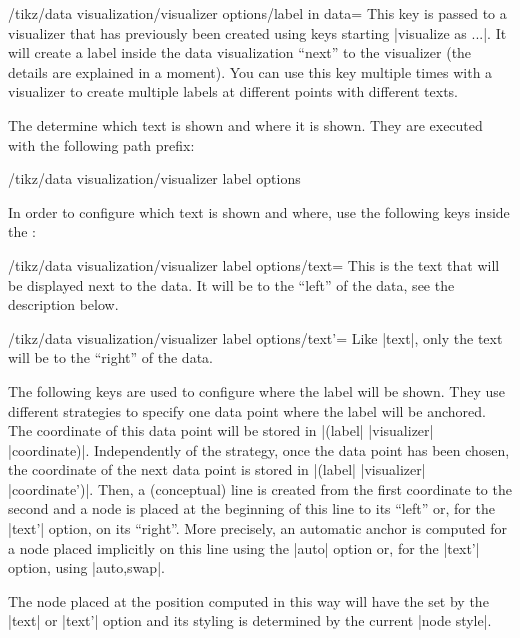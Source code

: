 \begin{key}{/tikz/data visualization/visualizer options/label in data=}
    This key is passed to a visualizer that has previously been created using
    keys starting |visualize as ...|. It will create a label inside the data
    visualization ``next'' to the visualizer (the details are explained in a
    moment). You can use this key multiple times with a visualizer to create
    multiple labels at different points with different texts.

    The  determine which text is shown and where it is shown.
    They are executed with the following path prefix:
\begin{codeexample}
/tikz/data visualization/visualizer label options
\end{codeexample}

    In order to configure which text is shown and where, use the following keys
    inside the :

    \begin{key}{/tikz/data visualization/visualizer label options/text=}
        This is the text that will be displayed next to the data. It will be to
        the ``left'' of the data, see the description below.
    \end{key}
    \begin{key}{/tikz/data visualization/visualizer label options/text'=}
        Like |text|, only the text will be to the ``right'' of the data.
    \end{key}

    The following keys are used to configure where the label will be shown.
    They use different strategies to specify one data point where the label
    will be anchored. The coordinate of this data point will be stored in
    |(label| |visualizer| |coordinate)|. Independently of the strategy, once
    the data point has been chosen, the coordinate of the next data point is
    stored in |(label| |visualizer| |coordinate')|. Then, a (conceptual) line
    is created from the first coordinate to the second and a node is placed at
    the beginning of this line to its ``left'' or, for the |text'| option, on
    its ``right''. More precisely, an automatic anchor is computed for a node
    placed implicitly on this line using the |auto| option or, for the |text'|
    option, using |auto,swap|.

    The node placed at the position computed in this way will have the
     set by the |text| or |text'| option and its styling is
    determined by the current |node style|.


\end{key}
